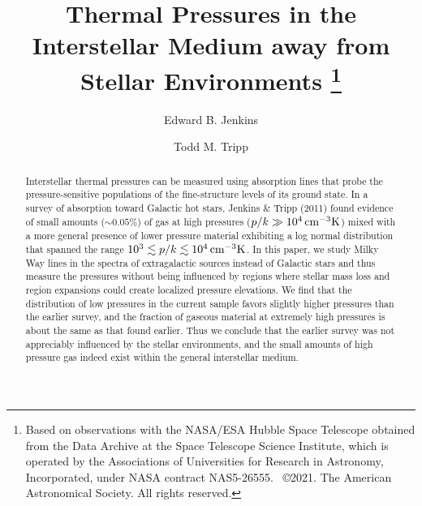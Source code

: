 \documentclass[modern]{aastex63}
\newcommand{\cmk}{\ensuremath{\,\rm{cm^{-3}K}}}
\begin{document}
\title{Thermal Pressures in the Interstellar Medium away from Stellar Environments 
\footnote{Based on observations with the NASA/ESA Hubble Space Telescope obtained from 
the Data Archive at the Space Telescope Science Institute, which is operated by the Associations 
of Universities for Research in Astronomy, Incorporated, under NASA contract NAS5-26555.~ 
\copyright 2021. The American Astronomical Society. All rights reserved.}}
\author[0000-0003-1892-4423]{Edward B. Jenkins}
\author[0000-0002-1218-640X]{Todd M. Tripp}
%
\begin{abstract}

Interstellar thermal pressures can be measured using  absorption lines that probe the 
pressure-sensitive populations of the fine-structure levels of its ground state. In a survey of 
  absorption toward Galactic hot stars, Jenkins \& Tripp (2011) found evidence of 
small amounts ($\sim 0.05\%$) of gas at high pressures ($p/k \gg 10^4\cmk$) mixed with a 
more general presence of lower pressure material exhibiting a log normal distribution that 
spanned the range $10^3 \lesssim p/k \lesssim 10^4\cmk$. In this paper, we study Milky Way 
  lines in the spectra of extragalactic sources instead of Galactic stars and thus 
measure the pressures without being influenced by regions where stellar mass loss and 
 region expansions could create localized pressure elevations.  We find that the 
distribution of low pressures in the current sample favors slightly higher pressures than the 
earlier survey, and the fraction of gaseous material at extremely high pressures is about the 
same as that found earlier.  Thus we conclude that the earlier survey was not appreciably 
influenced by the stellar environments, and the small amounts of high pressure gas indeed exist 
within the general interstellar medium.
\end{abstract}
%
\end{document}
